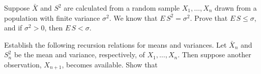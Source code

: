\documentclass[12pt,letterpaper]{exam}
\begin{document}
\begin{questions}
	\begin{solution}
		
	\end{solution}
	
	\setcounter{question}{10}
	\question 
	Suppose \(\bar{X}\) and \(S^2\) are calculated from a random sample \(X_1,\ldots, X_n\) 
	drawn from a population with finite variance \(\sigma^2\). We know that \(E\,S^2 = \sigma^2\). 
	Prove that \(E\,S \leq \sigma\), and
	if \(\sigma^2 > 0\), then \(E\,S < \sigma\).
	
	\begin{solution}
		
	\end{solution}
	
	\setcounter{question}{14}
	\question 
	Establish the following recursion relations for means and variances. 
	Let \(\bar{X}_n\) and \(S_n^2\) be the mean and variance, respectively, of \(X_1,\ldots,X_n\). 
	Then suppose another observation, \(X_{n+1}\), becomes available. Show that
	
	
	\begin{solution}
		\begin{parts}
			\part
			\[
			\bar{X}_{n+1} = \frac{\sum_{i=1}^{n+1}X_i}{n+1} = \frac{X_{n+1} + \sum_{i=1}^{n}X_i}{n+1} = \frac{X_{n+1} + n\bar X_n}{n+1}
			\]
			
			\part
			\[
			nS_{n+1}^2 = \sum_{i=1}^{n+1} \frac{\left(X_i - \bar{X}_{n+1} \right)^2}{(n+1)-1}
			\]
			

\end{parts}
\end{solution}
\end{questions}
\end{document}
